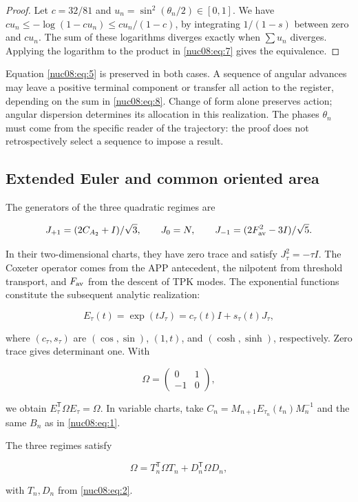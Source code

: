 \begin{proof}
Let \(c=32/81\) and \(u_n=\sin^2(\theta_n/2)\in[0,1]\). We have \(cu_n\leq-\log(1-cu_n)\leq cu_n/(1-c)\), by integrating \(1/(1-s)\) between zero and \(cu_n\). The sum of these logarithms diverges exactly when \(\sum u_n\) diverges. Applying the logarithm to the product in \eqref{nuc08:eq:7} gives the equivalence.
\end{proof}

Equation \eqref{nuc08:eq:5} is preserved in both cases. A sequence of angular advances may leave a positive terminal component or transfer all action to the register, depending on the sum in \eqref{nuc08:eq:8}. Change of form alone preserves action; angular dispersion determines its allocation in this realization. The phases \(\theta_n\) must come from the specific reader of the trajectory: the proof does not retrospectively select a sequence to impose a result.

\subsection{Extended Euler and common oriented area}

The generators of the three quadratic regimes are

\[
J_{+1}=(2C_{A_2}+I)/\sqrt3,\qquad
J_0=N,\qquad
J_{-1}=(2F_{\rm av}^2-3I)/\sqrt5.
\]

In their two-dimensional charts, they have zero trace and satisfy \(J_\tau^2=-\tau I\). The Coxeter operator comes from the APP antecedent, the nilpotent from threshold transport, and \(F_{\rm av}\) from the descent of TPK modes. The exponential functions constitute the subsequent analytic realization:

\[
E_\tau(t)=\exp(tJ_\tau)=c_\tau(t)I+s_\tau(t)J_\tau,
\]

where \((c_\tau,s_\tau)\) are \((\cos,\sin)\), \((1,t)\), and \((\cosh,\sinh)\), respectively. Zero trace gives determinant one. With

\[
\Omega=\begin{pmatrix}0&1\\-1&0\end{pmatrix},
\]

we obtain \(E_\tau^\mathsf T\Omega E_\tau=\Omega\). In variable charts, take \(C_n=M_{n+1}E_{\tau_n}(t_n)M_n^{-1}\) and the same \(B_n\) as in \eqref{nuc08:eq:1}.

\begin{theorem}
The three regimes satisfy

\begin{equation}
\boxed{\Omega=T_n^\mathsf T\Omega T_n+D_n^\mathsf T\Omega D_n,}
\label{nuc08:eq:9}
\end{equation}

with \(T_n,D_n\) from \eqref{nuc08:eq:2}.
\end{theorem}

